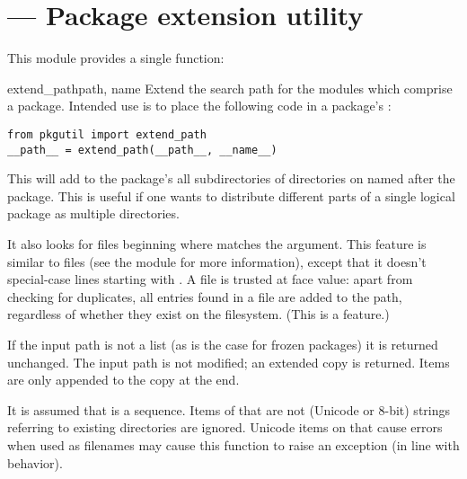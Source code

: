 \section{ ---
         Package extension utility}



This module provides a single function:

\begin{funcdesc}{extend_path}{path, name}
  Extend the search path for the modules which comprise a package.
  Intended use is to place the following code in a package's
  :

\begin{verbatim}
from pkgutil import extend_path
__path__ = extend_path(__path__, __name__)
\end{verbatim}

  This will add to the package's  all subdirectories of
  directories on  named after the package.  This is
  useful if one wants to distribute different parts of a single
  logical package as multiple directories.

  It also looks for  files beginning where \code{*}
  matches the  argument.  This feature is similar to
   files (see the  module for more
  information), except that it doesn't special-case lines starting
  with .  A  file is trusted at face value:
  apart from checking for duplicates, all entries found in a
   file are added to the path, regardless of whether they
  exist on the filesystem.  (This is a feature.)

  If the input path is not a list (as is the case for frozen
  packages) it is returned unchanged.  The input path is not
  modified; an extended copy is returned.  Items are only appended
  to the copy at the end.

  It is assumed that  is a sequence.  Items of
   that are not (Unicode or 8-bit) strings referring to
  existing directories are ignored.  Unicode items on 
  that cause errors when used as filenames may cause this function to
  raise an exception (in line with  behavior).
\end{funcdesc}
